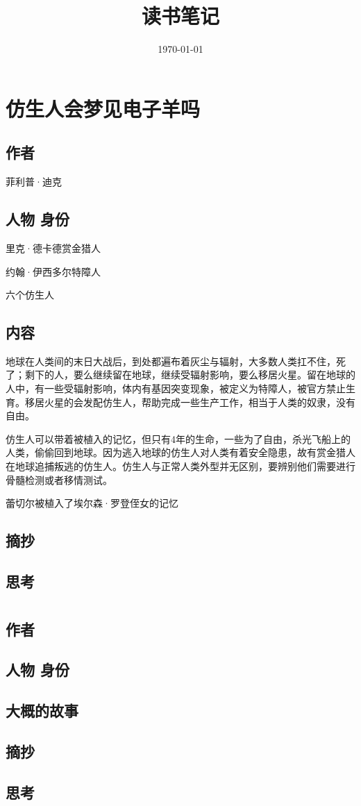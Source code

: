 \documentclass[a4paper]{ctexart}
\title{读书笔记}
\date{\today}
\begin{document}
	\maketitle		%
	\tableofcontents	%
	\newpage

\section{仿生人会梦见电子羊吗}
	\subsection{作者}
	{\kaishu 菲利普·迪克}
	\subsection{人物 身份}
	里克·德卡德\quad \quad 赏金猎人
	
	约翰·伊西多尔\quad \quad 特障人
	
	六个仿生人
	\subsection{内容}

	地球在人类间的末日大战后，到处都遍布着灰尘与辐射，大多数人类扛不住，死了；剩下的人，要么继续留在地球，继续受辐射影响，要么移居火星。留在地球的人中，有一些受辐射影响，体内有基因突变现象，被定义为特障人，被官方禁止生育。移居火星的会发配仿生人，帮助完成一些生产工作，相当于人类的奴隶，没有自由。

	仿生人可以带着被植入的记忆，但只有4年的生命，一些为了自由，杀光飞船上的人类，偷偷回到地球。因为逃入地球的仿生人对人类有着安全隐患，故有赏金猎人在地球追捕叛逃的仿生人。仿生人与正常人类外型并无区别，要辨别他们需要进行骨髓检测或者移情测试。	
	
	蕾切尔被植入了埃尔森·罗登侄女的记忆
	\subsection{摘抄}
	
	\subsection{思考}
	
	
\section{}
\subsection{作者}

\subsection{人物 身份}

\subsection{大概的故事}

\subsection{摘抄}

\subsection{思考}	
	
	
\end{document}
